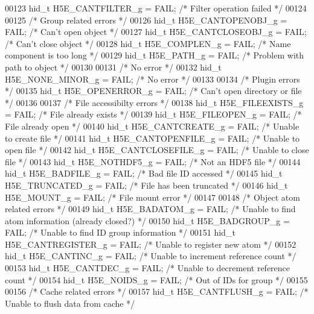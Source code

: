 \begin{DoxyCode}
00123 hid\_t H5E\_CANTFILTER\_g     = FAIL;      \textcolor{comment}{/* Filter operation failed */}
00124 
00125 \textcolor{comment}{/* Group related errors */}
00126 hid\_t H5E\_CANTOPENOBJ\_g    = FAIL;      \textcolor{comment}{/* Can't open object */}
00127 hid\_t H5E\_CANTCLOSEOBJ\_g   = FAIL;      \textcolor{comment}{/* Can't close object */}
00128 hid\_t H5E\_COMPLEN\_g        = FAIL;      \textcolor{comment}{/* Name component is too long */}
00129 hid\_t H5E\_PATH\_g           = FAIL;      \textcolor{comment}{/* Problem with path to object */}
00130 
00131 \textcolor{comment}{/* No error */}
00132 hid\_t H5E\_NONE\_MINOR\_g     = FAIL;      \textcolor{comment}{/* No error */}
00133 
00134 \textcolor{comment}{/* Plugin errors */}
00135 hid\_t H5E\_OPENERROR\_g      = FAIL;      \textcolor{comment}{/* Can't open directory or file */}
00136 
00137 \textcolor{comment}{/* File accessibilty errors */}
00138 hid\_t H5E\_FILEEXISTS\_g     = FAIL;      \textcolor{comment}{/* File already exists */}
00139 hid\_t H5E\_FILEOPEN\_g       = FAIL;      \textcolor{comment}{/* File already open */}
00140 hid\_t H5E\_CANTCREATE\_g     = FAIL;      \textcolor{comment}{/* Unable to create file */}
00141 hid\_t H5E\_CANTOPENFILE\_g   = FAIL;      \textcolor{comment}{/* Unable to open file */}
00142 hid\_t H5E\_CANTCLOSEFILE\_g  = FAIL;      \textcolor{comment}{/* Unable to close file */}
00143 hid\_t H5E\_NOTHDF5\_g        = FAIL;      \textcolor{comment}{/* Not an HDF5 file */}
00144 hid\_t H5E\_BADFILE\_g        = FAIL;      \textcolor{comment}{/* Bad file ID accessed */}
00145 hid\_t H5E\_TRUNCATED\_g      = FAIL;      \textcolor{comment}{/* File has been truncated */}
00146 hid\_t H5E\_MOUNT\_g          = FAIL;      \textcolor{comment}{/* File mount error */}
00147 
00148 \textcolor{comment}{/* Object atom related errors */}
00149 hid\_t H5E\_BADATOM\_g        = FAIL;      \textcolor{comment}{/* Unable to find atom information (already closed?) */}
00150 hid\_t H5E\_BADGROUP\_g       = FAIL;      \textcolor{comment}{/* Unable to find ID group information */}
00151 hid\_t H5E\_CANTREGISTER\_g   = FAIL;      \textcolor{comment}{/* Unable to register new atom */}
00152 hid\_t H5E\_CANTINC\_g        = FAIL;      \textcolor{comment}{/* Unable to increment reference count */}
00153 hid\_t H5E\_CANTDEC\_g        = FAIL;      \textcolor{comment}{/* Unable to decrement reference count */}
00154 hid\_t H5E\_NOIDS\_g          = FAIL;      \textcolor{comment}{/* Out of IDs for group */}
00155 
00156 \textcolor{comment}{/* Cache related errors */}
00157 hid\_t H5E\_CANTFLUSH\_g      = FAIL;      \textcolor{comment}{/* Unable to flush data from cache */}

\end{DoxyCode}
